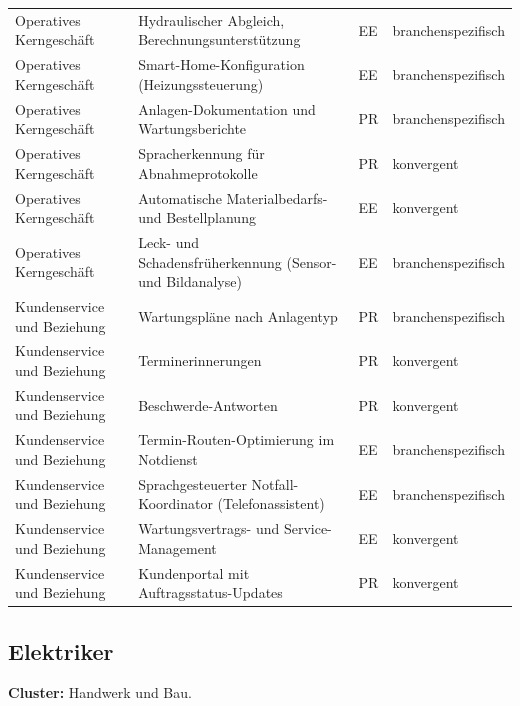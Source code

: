 \documentclass[a4paper,11pt]{article}
\begin{document}
\begin{table}[H]
\begin{tabular}{p{3.3cm}p{7.3cm}p{1cm}p{2.5cm}}
Operatives Kerngeschäft & Hydraulischer Abgleich, Berechnungsunterstützung & EE & branchenspezifisch \\
Operatives Kerngeschäft & Smart-Home-Konfiguration (Heizungssteuerung) & EE & branchenspezifisch \\
Operatives Kerngeschäft & Anlagen-Dokumentation und Wartungsberichte & PR & branchenspezifisch \\
Operatives Kerngeschäft & Spracherkennung für Abnahmeprotokolle & PR & konvergent \\
Operatives Kerngeschäft & Automatische Materialbedarfs- und Bestellplanung & EE & konvergent \\
Operatives Kerngeschäft & Leck- und Schadensfrüherkennung (Sensor- und Bildanalyse) & EE & branchenspezifisch \\
Kundenservice und Beziehung & Wartungspläne nach Anlagentyp & PR & branchenspezifisch \\
Kundenservice und Beziehung & Terminerinnerungen & PR & konvergent \\
Kundenservice und Beziehung & Beschwerde-Antworten & PR & konvergent \\
Kundenservice und Beziehung & Termin-Routen-Optimierung im Notdienst & EE & branchenspezifisch \\
Kundenservice und Beziehung & Sprachgesteuerter Notfall-Koordinator (Telefonassistent) & EE & branchenspezifisch \\
Kundenservice und Beziehung & Wartungsvertrags- und Service-Management & EE & konvergent \\
Kundenservice und Beziehung & Kundenportal mit Auftragsstatus-Updates & PR & konvergent \\
\bottomrule
\end{tabular}
\end{table}

\subsection*{Elektriker}

\textbf{Cluster:} Handwerk und Bau.
\end{document}
